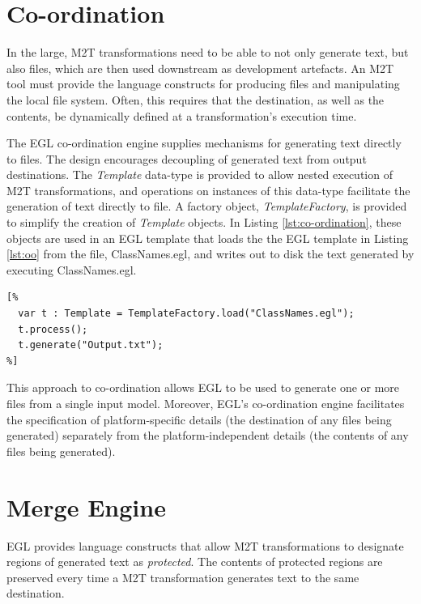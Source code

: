 \section{Co-ordination}
\label{Co-ordination}
In the large, M2T transformations need to be able to not only generate
text, but also files, which are then used downstream as development
artefacts.  An M2T tool must provide the language constructs for
producing files and manipulating the local file system.  Often, this
requires that the destination, as well as the contents, be dynamically
defined at a transformation's execution time.

The EGL co-ordination engine supplies mechanisms for generating text
directly to files.  The design encourages decoupling of generated text
from output destinations. The \emph{Template} data-type is provided to
allow nested execution of M2T transformations, and operations on
instances of this data-type facilitate the generation of text directly
to file. A factory object, \emph{TemplateFactory}, is provided to
simplify the creation of \emph{Template} objects.  In Listing
\ref{lst:co-ordination}, these objects are used in an EGL template
that loads the the EGL template in Listing \ref{lst:oo} from the file,
ClassNames.egl, and writes out to disk the text generated by executing
ClassNames.egl.

\begin{lstlisting}[basicstyle=\ttfamily\footnotesize, tabsize=2, flexiblecolumns=true, caption=Storing the name of each Class to disk., label=lst:co-ordination]
[%
  var t : Template = TemplateFactory.load("ClassNames.egl");
  t.process();
  t.generate("Output.txt");
%]
\end{lstlisting}

This approach to co-ordination allows EGL to be used to generate one
or more files from a single input model. Moreover, EGL's co-ordination
engine facilitates the specification of platform-specific details (the
destination of any files being generated) separately from the
platform-independent details (the contents of any files being
generated).

\section{Merge Engine}
EGL provides language constructs that allow M2T transformations to
designate regions of generated text as \textit{protected}. The
contents of protected regions are preserved every time a M2T
transformation generates text to the same destination.


